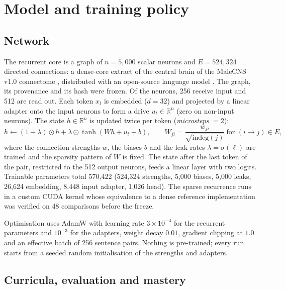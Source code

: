 \documentclass[preprint,12pt,authoryear]{elsarticle}
\begin{document}
\section{Model and training policy}
\label{sec:model}

\subsection{Network}

The recurrent core is a graph of $n{=}5{,}000$ scalar neurons and $E{=}524{,}324$ directed connections: a dense-core extract of the central brain of the MaleCNS v1.0 connectome \citep{berg2026malecns,hartford2026malecns}, distributed with an open-source language model \citep{flygpt}. The graph, its provenance and its hash were frozen. Of the neurons, 256 receive input and 512 are read out. Each token $x_t$ is embedded ($d{=}32$) and projected by a linear adapter onto the input neurons to form a drive $u_t\in\mathbb{R}^n$ (zero on non-input neurons). The state $h\in\mathbb{R}^n$ is updated twice per token (\emph{microsteps} $=2$):
\begin{equation}
h \leftarrow (1-\lambda)\odot h + \lambda\odot\tanh\!\left(W h + u_t + b\right),
\qquad W_{ji} = \frac{w_{ji}}{\sqrt{\mathrm{indeg}(j)}}\ \text{for } (i\!\to\! j)\in E,
\end{equation}
where the connection strengths $w$, the biases $b$ and the leak rates $\lambda{=}\sigma(\ell)$ are trained and the sparsity pattern of $W$ is fixed. The state after the last token of the pair, restricted to the 512 output neurons, feeds a linear layer with two logits. Trainable parameters total 570{,}422 (524{,}324 strengths, 5{,}000 biases, 5{,}000 leaks, 26{,}624 embedding, 8{,}448 input adapter, 1{,}026 head). The sparse recurrence runs in a custom CUDA kernel whose equivalence to a dense reference implementation was verified on 48 comparisons before the freeze.

Optimisation uses AdamW \citep{loshchilov2019} with learning rate $3{\times}10^{-4}$ for the recurrent parameters and $10^{-3}$ for the adapters, weight decay $0.01$, gradient clipping at $1.0$ and an effective batch of 256 sentence pairs. Nothing is pre-trained; every run starts from a seeded random initialisation of the strengths and adapters.

\subsection{Curricula, evaluation and mastery}
\end{document}
